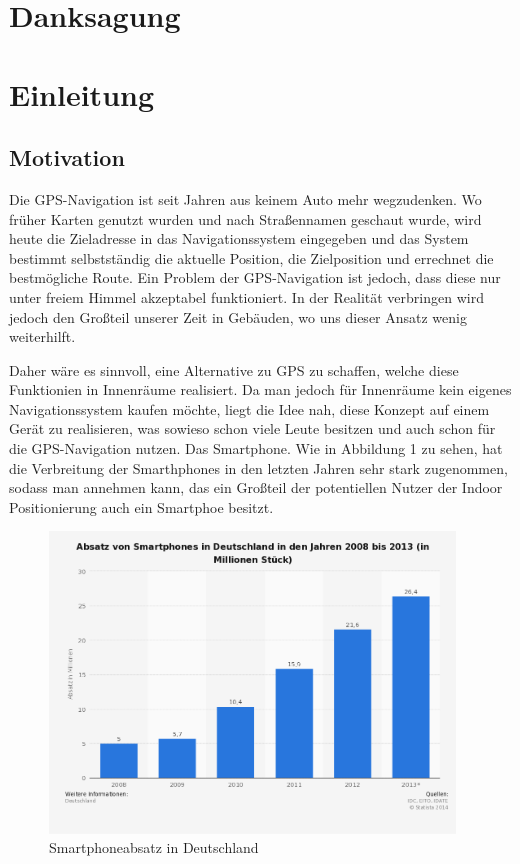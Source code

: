\documentclass[liststotoc,a4paper, 12pt]{scrartcl}
\begin{document}
\newpage



\tableofcontents


\newpage

\listoffigures
\newpage

\listoftables
\newpage

\lstlistoflistings
\newpage

\setcounter{page}{1}
\setcounter{secnumdepth}{2}


\section{Danksagung}

\section{Einleitung}
\subsection{Motivation}
Die GPS-Navigation ist seit Jahren aus keinem Auto mehr wegzudenken. Wo früher Karten genutzt wurden und nach Straßennamen geschaut wurde, wird heute die Zieladresse in das Navigationssystem eingegeben und das System bestimmt selbstständig die aktuelle Position, die Zielposition und errechnet die bestmögliche Route.
Ein Problem der GPS-Navigation ist jedoch, dass diese nur unter freiem Himmel akzeptabel funktioniert.
In der Realität verbringen wird jedoch den Großteil unserer Zeit in Gebäuden, wo uns dieser Ansatz wenig weiterhilft. 

Daher wäre es sinnvoll, eine Alternative zu GPS zu schaffen, welche diese Funktionien in Innenräume realisiert.
Da man jedoch für Innenräume kein eigenes Navigationssystem kaufen möchte, liegt die Idee nah, diese Konzept auf einem Gerät zu realisieren, was sowieso schon viele Leute besitzen und auch schon für die GPS-Navigation nutzen. 
Das Smartphone.
Wie in Abbildung 1 zu sehen, hat die Verbreitung der Smarthphones in den letzten Jahren sehr stark zugenommen, sodass man annehmen kann, das ein Großteil der potentiellen Nutzer der Indoor Positionierung auch ein Smartphoe besitzt.
\begin{figure}[htb]
	\centering
		\includegraphics[height=8cm]{pictures/statistik-smartphonenutzung.png}
		\caption{Smartphoneabsatz in Deutschland}
\end{figure}
\end{document}
